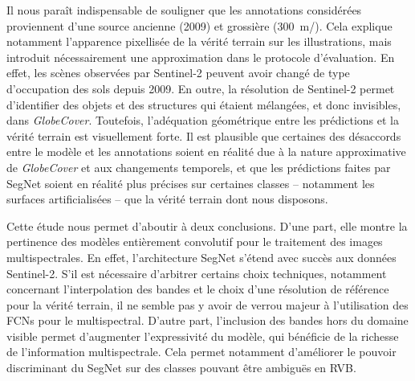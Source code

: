 Il nous paraît indispensable de souligner que les annotations considérées proviennent d'une source ancienne (2009) et grossière (\SI{300}{\meter/\px}). Cela explique notamment l'apparence pixellisée de la vérité terrain sur les illustrations, mais introduit nécessairement une approximation dans le protocole d'évaluation. En effet, les scènes observées par Sentinel-2 peuvent avoir changé de type d'occupation des sols depuis 2009. En outre, la résolution de Sentinel-2 permet d'identifier des objets et des structures qui étaient mélangées, et donc invisibles, dans \emph{GlobeCover}. Toutefois, l'adéquation géométrique entre les prédictions et la vérité terrain est visuellement forte. Il est plausible que certaines des désaccords entre le modèle et les annotations soient en réalité due à la nature approximative de \emph{GlobeCover} et aux changements temporels, et que les prédictions faites par SegNet soient en réalité plus précises sur certaines classes -- notamment les surfaces artificialisées -- que la vérité terrain dont nous disposons.

Cette étude nous permet d'aboutir à deux conclusions. D'une part, elle montre la pertinence des modèles entièrement convolutif pour le traitement des images multispectrales. En effet, l'architecture SegNet s'étend avec succès aux données Sentinel-2. S'il est nécessaire d'arbitrer certains choix techniques, notamment concernant l'interpolation des bandes et le choix d'une résolution de référence pour la vérité terrain, il ne semble pas y avoir de verrou majeur à l'utilisation des \glspl{FCN} pour le multispectral. D'autre part, l'inclusion des bandes hors du domaine visible permet d'augmenter l'expressivité du modèle, qui bénéficie de la richesse de l'information multispectrale. Cela permet notamment d'améliorer le pouvoir discriminant du SegNet sur des classes pouvant être ambiguës en \gls{RVB}.

